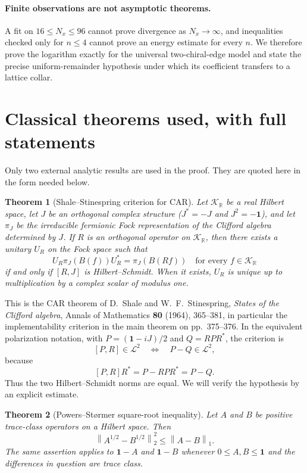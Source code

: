 \documentclass[11pt]{article}
\newtheorem{theorem}{Theorem}[section]
\theoremstyle{remark}
\newcommand{\id}{\mathbf 1}
\newcommand{\K}{\mathcal K}
\newcommand{\norm}[1]{\left\lVert #1\right\rVert}
\begin{document}
\paragraph{Finite observations are not asymptotic theorems.}
A fit on $16\le N_x\le96$ cannot prove divergence as $N_x\to\infty$, and
inequalities checked only for $n\le4$ cannot prove an energy estimate for
every $n$.  We therefore prove the logarithm exactly for the universal
two-chiral-edge model and state the precise uniform-remainder hypothesis
under which its coefficient transfers to a lattice collar.

\section{Classical theorems used, with full statements}

Only two external analytic results are used in the proof.  They are
quoted here in the form needed below.

\begin{theorem}[Shale--Stinespring criterion for CAR]\label{thm:ss}
Let $\K_{\mathbb R}$ be a real Hilbert space, let $J$ be an orthogonal
complex structure ($J^*=-J$ and $J^2=-\id$), and let $\pi_J$ be the
irreducible fermionic Fock representation of the Clifford algebra
determined by $J$.  If $R$ is an orthogonal operator on
$\K_{\mathbb R}$, then there exists a unitary $U_R$ on the Fock space
such that
\[
 U_R\pi_J(B(f))U_R^*=\pi_J(B(Rf))
 \quad\text{for every }f\in\K_{\mathbb R}
\]
if and only if $[R,J]$ is Hilbert--Schmidt.  When it exists, $U_R$ is
unique up to multiplication by a complex scalar of modulus one.
\end{theorem}

This is the CAR theorem of D.~Shale and W.~F.~Stinespring,
\emph{States of the Clifford algebra}, Annals of Mathematics
\textbf{80} (1964), 365--381, in particular the implementability
criterion in the main theorem on pp.~375--376.  In the equivalent
polarization notation, with $P=(\id-iJ)/2$ and $Q=RPR^*$, the criterion
is
\[
 [P,R]\in\mathcal L^2
 \quad\Longleftrightarrow\quad
 P-Q\in\mathcal L^2,
\]
because
\[
 [P,R]R^*=P-RPR^*=P-Q.
\]
Thus the two Hilbert--Schmidt norms are equal.  We will verify the
hypothesis by an explicit estimate.

\begin{theorem}[Powers--St{\o}rmer square-root inequality]
\label{thm:ps}
Let $A$ and $B$ be positive trace-class operators on a Hilbert space.
Then
\[
 \norm{A^{1/2}-B^{1/2}}_2^2\le \norm{A-B}_1.
\]
The same assertion applies to $\id-A$ and $\id-B$ whenever
$0\le A,B\le\id$ and the differences in question are trace class.
\end{theorem}
\end{document}
